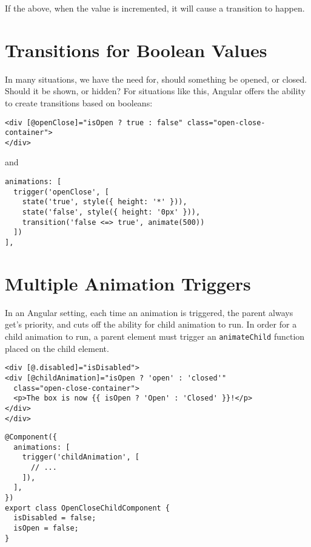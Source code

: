 If the above, when the value is incremented, it will cause a transition to 
happen. 


\section{ Transitions for Boolean Values }
In many situations, we have the need for, should something be opened, or closed. 
Should it be shown, or hidden? For situations like this, Angular offers the 
ability to create transitions based on booleans: 
\begin{lstlisting}[caption=open-close.component.html]
<div [@openClose]="isOpen ? true : false" class="open-close-container">
</div>
\end{lstlisting}
and
\begin{lstlisting}[caption=open-close.component.ts]
animations: [
  trigger('openClose', [
    state('true', style({ height: '*' })),
    state('false', style({ height: '0px' })),
    transition('false <=> true', animate(500))
  ])
],
\end{lstlisting}

\section{ Multiple Animation Triggers }
In an Angular setting, each time an animation is triggered, the parent always
get's priority, and cuts off the ability for child animation to run. In order 
for a child animation to run, a parent element must trigger an 
\lstinline{animateChild} function placed on the child element. 
\begin{lstlisting}[caption=open-close.component.html]
<div [@.disabled]="isDisabled">
<div [@childAnimation]="isOpen ? 'open' : 'closed'"
  class="open-close-container">
  <p>The box is now {{ isOpen ? 'Open' : 'Closed' }}!</p>
</div>
</div>  
\end{lstlisting}
\begin{lstlisting}[caption=open-close.component.ts]
@Component({
  animations: [
    trigger('childAnimation', [
      // ...
    ]),
  ],
})
export class OpenCloseChildComponent {
  isDisabled = false;
  isOpen = false;
}
\end{lstlisting}

